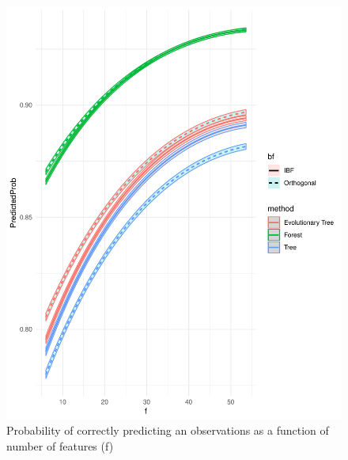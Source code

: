 \documentclass[]{elsarticle} %
\makeatletter
\def\maxwidth{\ifdim\Gin@nat@width>\linewidth\linewidth
\else\Gin@nat@width\fi}
\let\Oldincludegraphics\includegraphics
\renewcommand{\includegraphics}[1]{\Oldincludegraphics[width=\maxwidth]{#1}}
\makeatother
\begin{document}
\begin{figure}
\centering
\includegraphics{Trees_with_Base_Functions_v2_files/figure-latex/fig13-estimated-accuracy-f-1.pdf}
\caption{\label{fig:fig13-estimated-accuracy-f}Probability of correctly
predicting an observations as a function of number of features (f)}
\end{figure}
\end{document}
